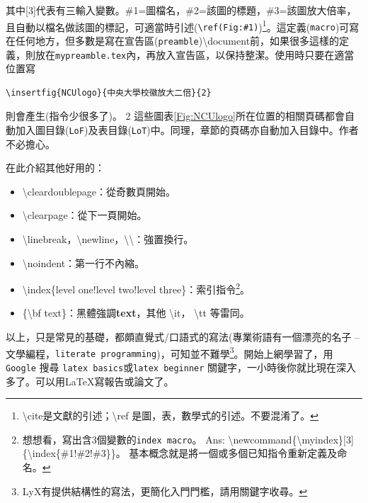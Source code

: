 其中[3]代表有三輸入變數。\#1=圖檔名，\#2=該圖的標題，\#3=該圖放大倍率，且自動以檔名做該圖的標記，可適當時引述({\tt \textbackslash ref(Fig:\#1)})\footnote{\textbackslash cite是文獻的引述；\textbackslash ref 是圖，表，數學式的引述。不要混淆了。}。這定義({\tt macro})可寫在任何地方，但多數是寫在宣告區({\tt preamble})\textbackslash document前，如果很多這樣的定義，則放在{\tt mypreamble.tex}內，再放入宣告區，以保持整潔。使用時只要在適當位置寫
\begin{Verbatim}[frame=single,firstline=1,label={Macro usage}]
\insertfig{NCUlogo}{中央大學校徽放大二倍}{2}
\end{Verbatim}
則會產生(指令少很多了)。
 {2}
這些圖表\ref{Fig:NCUlogo}所在位置的相關頁碼都會自動加入圖目錄({\tt LoF})及表目錄({\tt LoT})中。同理，章節的頁碼亦自動加入目錄中。作者不必擔心。


在此介紹其他好用的：
\begin{itemize}
\item \textbackslash cleardoublepage：從奇數頁開始。 
\item \textbackslash clearpage：從下一頁開始。       
\item \textbackslash linebreak，\textbackslash newline，\textbackslash\textbackslash：強置換行。  
\item \textbackslash noindent：第一行不內縮。        
\item \textbackslash index\{level one!level two!level three\}：索引指令\footnote{想想看，寫出含3個變數的{\tt index macro}。 Ans: \textbackslash newcommand\{\textbackslash myindex\}[3]\{\textbackslash index\{\#1!\#2!\#3\}\}。 基本概念就是將一個或多個已知指令重新定義及命名。}。
\item \{\textbackslash bf text\}：黑體強調{\bf text}，其他 \textbackslash it， \textbackslash tt 等雷同。
\end{itemize}
以上，只是常見的基礎，都頗直覺式/口語式的寫法(專業術語有一個漂亮的名子 -- 文學編程，{\tt literate programming})，可知並不難學\footnote{LyX有提供結構性的寫法，更簡化入門門檻，請用關鍵字收尋。}。開始上網學習了，用 {\tt Google} 搜尋 {\tt latex basics}或{\tt latex beginner} 關鍵字，一小時後你就比現在深入多了。可以用\LaTeX{}寫報告或論文了。

